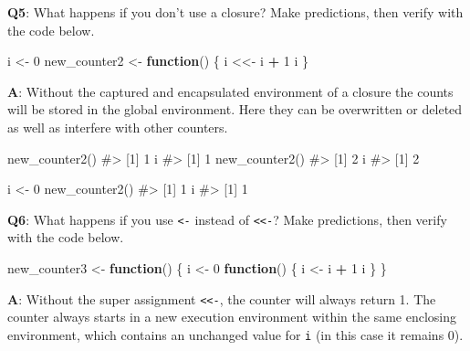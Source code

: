 \documentclass[
]{krantz}
\makeatletter
\newenvironment{Shaded}{\begin{snugshade}}{\end{snugshade}}
\newcommand{\CommentTok}[1]{\textcolor[rgb]{0.56,0.35,0.01}{\textit{#1}}}
\newcommand{\ControlFlowTok}[1]{\textcolor[rgb]{0.13,0.29,0.53}{\textbf{#1}}}
\newcommand{\DecValTok}[1]{\textcolor[rgb]{0.00,0.00,0.81}{#1}}
\newcommand{\KeywordTok}[1]{\textcolor[rgb]{0.13,0.29,0.53}{\textbf{#1}}}
\newcommand{\NormalTok}[1]{#1}
\newcommand{\OperatorTok}[1]{\textcolor[rgb]{0.81,0.36,0.00}{\textbf{#1}}}
\newcommand{\StringTok}[1]{\textcolor[rgb]{0.31,0.60,0.02}{#1}}
\newenvironment{kframe}{%
\medskip{}
\setlength{\fboxsep}{.8em}
 \def\at@end@of@kframe{}%
 \ifinner\ifhmode%
  \def\at@end@of@kframe{\end{minipage}}%
  \begin{minipage}{\columnwidth}%
 \fi\fi%
 \def\FrameCommand##1{\hskip\@totalleftmargin \hskip-\fboxsep
 \colorbox{shadecolor}{##1}\hskip-\fboxsep
     \hskip-\linewidth \hskip-\@totalleftmargin \hskip\columnwidth}%
 \MakeFramed {\advance\hsize-\width
   \@totalleftmargin\z@ \linewidth\hsize
   \@setminipage}}%
 {\par\unskip\endMakeFramed%
 \at@end@of@kframe}
\renewenvironment{Shaded}{\begin{kframe}}{\end{kframe}}
\renewcommand{\KeywordTok} [1]{\textcolor[rgb]{0.00,0.44,0.13}{{#1}}}
\renewcommand{\DecValTok}  [1]{\textcolor[rgb]{0.25,0.63,0.44}{{#1}}}
\renewcommand{\StringTok}  [1]{\textcolor[rgb]{0.25,0.44,0.63}{{#1}}}
\renewcommand{\CommentTok} [1]{\textcolor[rgb]{0.38,0.63,0.69}{{#1}}}
\renewcommand{\NormalTok}  [1]{{#1}}
\makeatother
\begin{document}
\textbf{{Q5}}: What happens if you don't use a closure? Make predictions, then verify with the code below.

\begin{Shaded}
\begin{Highlighting}[]
\NormalTok{i <-}\StringTok{ }\DecValTok{0}
\NormalTok{new_counter2 <-}\StringTok{ }\ControlFlowTok{function}\NormalTok{() \{}
\NormalTok{  i <<-}\StringTok{ }\NormalTok{i }\OperatorTok{+}\StringTok{ }\DecValTok{1}
\NormalTok{  i}
\NormalTok{\}}
\end{Highlighting}
\end{Shaded}

\textbf{{A}}: Without the captured and encapsulated environment of a closure the counts will be stored in the global environment. Here they can be overwritten or deleted as well as interfere with other counters.

\begin{Shaded}
\begin{Highlighting}[]
\KeywordTok{new_counter2}\NormalTok{()}
\CommentTok{#> [1] 1}
\NormalTok{i}
\CommentTok{#> [1] 1}
\KeywordTok{new_counter2}\NormalTok{()}
\CommentTok{#> [1] 2}
\NormalTok{i}
\CommentTok{#> [1] 2}

\NormalTok{i <-}\StringTok{ }\DecValTok{0}
\KeywordTok{new_counter2}\NormalTok{()}
\CommentTok{#> [1] 1}
\NormalTok{i}
\CommentTok{#> [1] 1}
\end{Highlighting}
\end{Shaded}

\textbf{{Q6}}: What happens if you use \texttt{\textless{}-} instead of \texttt{\textless{}\textless{}-}? Make predictions, then verify with the code below.

\begin{Shaded}
\begin{Highlighting}[]
\NormalTok{new_counter3 <-}\StringTok{ }\ControlFlowTok{function}\NormalTok{() \{}
\NormalTok{  i <-}\StringTok{ }\DecValTok{0}
  \ControlFlowTok{function}\NormalTok{() \{}
\NormalTok{    i <-}\StringTok{ }\NormalTok{i }\OperatorTok{+}\StringTok{ }\DecValTok{1}
\NormalTok{    i}
\NormalTok{  \}}
\NormalTok{\}}
\end{Highlighting}
\end{Shaded}

\textbf{{A}}: Without the super assignment \texttt{\textless{}\textless{}-}, the counter will always return 1. The counter always starts in a new execution environment within the same enclosing environment, which contains an unchanged value for \texttt{i} (in this case it remains 0).
\end{document}
